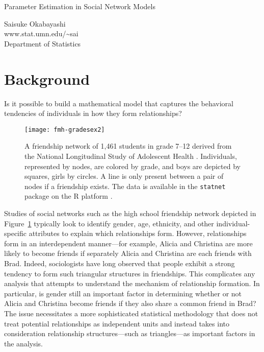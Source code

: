 \documentclass[12pt]{article}
\begin{document}
\begin{center}
{\normalsize{Parameter Estimation in Social Network Models}} 

\vspace{0.15in}
{Saisuke Okabayashi} \\
www.stat.umn.edu/\textasciitilde sai\\
{Department of Statistics}\\
\end{center}


\section{Background}
Is it possible to build a mathematical model that captures the behavioral tendencies of individuals in how they form relationships?

\begin{figure}[h!]
\centering
\texttt{[image: fmh-gradesex2]}
\caption{A friendship network of 1,461 students in grade 7--12 derived 
from the National Longitudinal Study of Adolescent Health \citep{Resnick:1997}.  
Individuals, represented by nodes, are colored by grade, and boys
are depicted by squares, girls by circles.  A line is only present between a pair of 
nodes if a friendship exists.  The data is available in the 
\texttt{statnet} package \citep{statnet:R} on the R platform \citep{R}.}
\label{F:fmh}
\end{figure}

Studies of social networks such as the high school friendship network depicted 
in Figure~\ref{F:fmh} typically look to identify gender, age, ethnicity, and 
other individual-specific attributes to explain which relationships form.  
However, relationships form in an interdependent manner---for example, Alicia 
and Christina are more likely to become friends if separately Alicia and Christina 
are each friends with Brad. Indeed, sociologists have long observed that people 
exhibit a strong tendency to form such triangular structures in friendships.
This complicates any analysis that attempts to understand the mechanism of 
relationship formation.   
In particular, is gender still an important factor in determining whether or not 
Alicia and Christina become friends if they also share a common friend in Brad? 
The issue necessitates a more sophisticated statistical methodology that 
does not treat potential relationships as independent units and instead 
takes into consideration relationship structures---such as triangles---as 
important factors in the analysis.
\end{document}
